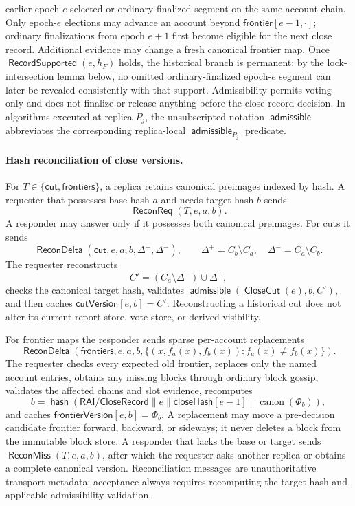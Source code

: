 \documentclass[sigplan,twocolumn,review,anonymous]{acmart}
\newcommand{\func}[1]{\operatorname{\mathsf{#1}}}
\newcommand{\hash}{\func{hash}}
\newcommand{\CloseCut}{\func{CloseCut}}
\newcommand{\admissible}{\func{admissible}}
\newcommand{\frontier}{\mathsf{frontier}}
\newcommand{\closeHash}{\mathsf{closeHash}}
\newcommand{\RecordSupported}{\func{RecordSupported}}
\newcommand{\cutVersion}{\mathsf{cutVersion}}
\newcommand{\frontierVersion}{\mathsf{frontierVersion}}
\newcommand{\ReconReq}{\func{ReconReq}}
\newcommand{\ReconDelta}{\func{ReconDelta}}
\newcommand{\ReconMiss}{\func{ReconMiss}}
\begin{document}
earlier epoch-\(e\) selected or ordinary-finalized segment on the same account chain.  Only epoch-\(e\)
elections may advance an account beyond \(\frontier[e-1,\cdot]\); ordinary finalizations from epoch
\(e+1\) first become eligible for the next close record.  Additional evidence may change a fresh
canonical frontier map.  Once \(\RecordSupported(e,h_F)\) holds, the historical branch is permanent:
by the lock-intersection lemma below, no omitted ordinary-finalized epoch-\(e\) segment can later be
revealed consistently with that support.  Admissibility permits voting only and does not finalize or
release anything before the close-record decision.  In algorithms executed at replica \(P_j\), the
unsubscripted notation \(\admissible\) abbreviates the corresponding replica-local
\(\admissible_{P_j}\) predicate.

\paragraph{Hash reconciliation of close versions.}
For \(T\in\{\mathsf{cut},\mathsf{frontiers}\}\), a replica retains canonical preimages indexed by
hash.  A requester that possesses base hash \(a\) and needs target hash \(b\) sends
\[
\ReconReq(T,e,a,b).
\]
A responder may answer only if it possesses both canonical preimages.  For cuts it sends
\[
\ReconDelta(\mathsf{cut},e,a,b,\Delta^+,\Delta^-),
\qquad
\Delta^+=C_b\setminus C_a,
\quad
\Delta^-=C_a\setminus C_b.
\]
The requester reconstructs
\[
C'=(C_a\setminus\Delta^-)\cup\Delta^+,
\]
checks the canonical target hash, validates \(\admissible(\CloseCut(e),b,C')\), and then caches
\(\cutVersion[e,b]=C'\).  Reconstructing a historical cut does not alter its current report store, vote store, or derived visibility.

For frontier maps the responder sends sparse per-account replacements
\[
\ReconDelta(\mathsf{frontiers},e,a,b,
\{(x,f_a(x),f_b(x)):f_a(x)\neq f_b(x)\}).
\]
The requester checks every expected old frontier, replaces only the named account entries, obtains any
missing blocks through ordinary block gossip, validates the affected chains and slot evidence, recomputes
\[
b=\hash(\mathsf{RAI/CloseRecord}\parallel e\parallel\closeHash[e-1]
\parallel\operatorname{canon}(\Phi_b)),
\]
and caches \(\frontierVersion[e,b]=\Phi_b\).  A replacement may move a pre-decision candidate frontier
forward, backward, or sideways; it never deletes a block from the immutable block store.  A responder
that lacks the base or target sends \(\ReconMiss(T,e,a,b)\), after which the requester asks another
replica or obtains a complete canonical version.  Reconciliation messages are unauthoritative transport
metadata: acceptance always requires recomputing the target hash and applicable admissibility validation.
\end{document}
